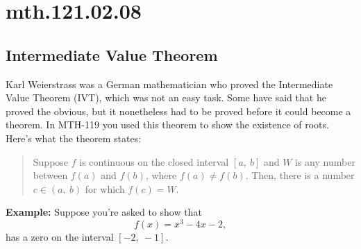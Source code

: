 \documentclass[12pt,addpoints, answers, fleqn]{exam}
\begin{document}
\section{mth.121.02.08}
\subsection{Intermediate Value Theorem}

Karl Weierstrass was a German mathematician who proved the Intermediate Value Theorem (IVT), which was not an easy task. Some have said that he proved the obvious, but it nonetheless had to be proved before it could become a theorem. In MTH-119 you used this theorem to show the existence of roots. Here's what the theorem states:
\begin{quote}
Suppose $f$ is continuous on the closed interval $\left[ a, \ b \right]$ and $W$ is any number between $f \left( a \right)$ and $f \left( b\right)$, where $f \left( a \right) \neq f \left( b \right)$. Then, there is a number $c \in \left( a, \ b \right)$ for which $f \left(c\right) = W$.
\end{quote}

\textbf{Example:} Suppose you're asked to show that
\[
f \left( x \right) = x^3 - 4x - 2,
\]
has a zero on the interval $\left[ -2, \ -1 \right]$.
\end{document}
